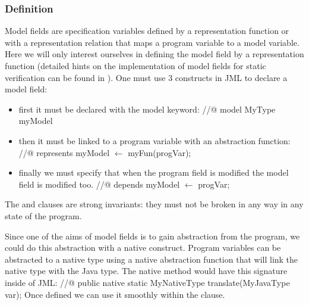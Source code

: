\subsubsection{Definition}
Model fields are specification variables defined by a representation 
function or with a representation relation that maps a program variable 
to a model variable. 
Here we will only interest ourselves in defining the model field by 
a representation function (detailed hints on the implementation of 
model fields for static verification can be found in 
 \cite{LeinoMueller06,breunesse03verifying}). 
One must use 3 constructs in JML to declare a model field:
\begin{itemize}
\item first it must be declared with the model keyword: 
\btab 
//@ model MyType myModel
\etab
\item then it must be linked to a program variable with an abstraction 
function:
\btab
//@ represents myModel $\leftarrow$ myFun(progVar);
\etab
\item finally we must specify that when the program field is modified 
the model field is modified too.
\btab
//@ depends myModel $\leftarrow$ progVar;
\etab
\end{itemize}
The  and  clauses are strong invariants: 
they must not be broken in any way in any state of the program.

Since one of the aims of model fields is to gain abstraction from the program, 
we could do this abstraction with a native construct. Program variables can be 
abstracted to a native type using a native abstraction function that will link
 the native type with the Java type. 
The native method would have this signature inside of JML:
\btab
//@ public native static MyNativeType translate(MyJavaType var);
\etab
Once defined we can use it smoothly within the  clause.
